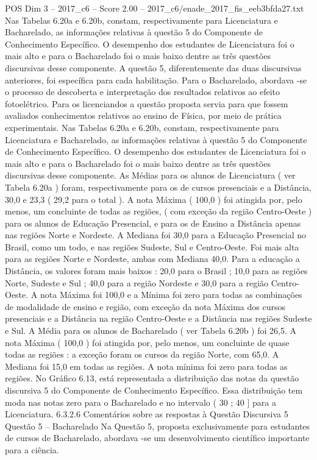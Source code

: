 \begin{textsample}{POS Dim 3 – 2017\_c6 – Score 2.00 – 2017\_c6/enade\_2017\_fis\_eeb3bfda27.txt}
Nas Tabelas 6.20a e 6.20b, constam, respectivamente para Licenciatura e Bacharelado, as informações relativas à questão 5 do Componente de Conhecimento Específico.
O desempenho dos estudantes de Licenciatura foi o mais alto e para o Bacharelado foi o mais baixo dentre as três questões discursivas desse componente.
A questão 5, diferentemente das duas discursivas anteriores, foi específica para cada habilitação.
Para o Bacharelado, abordava -se o processo de descoberta e interpretação dos resultados relativos ao efeito fotoelétrico.
Para os licenciandos a questão proposta servia para que fossem avaliados conhecimentos relativos ao ensino de Física, por meio de prática experimentais.
Nas Tabelas 6.20a e 6.20b, constam, respectivamente para Licenciatura e Bacharelado, as informações relativas à questão 5 do Componente de Conhecimento Específico.
O desempenho dos estudantes de Licenciatura foi o mais alto e para o Bacharelado foi o mais baixo dentre as três questões discursivas desse componente.
As Médias para os alunos de Licenciatura ( ver Tabela 6.20a ) foram, respectivamente para os de cursos presenciais e a Distância, 30,0 e 23,3 ( 29,2 para o total ).
A nota Máxima ( 100,0 ) foi atingida por, pelo menos, um concluinte de todas as regiões, ( com exceção da região Centro-Oeste ) para os alunos de Educação Presencial, e para os de Ensino a Distância apenas nas regiões Norte e Nordeste.
A Mediana foi 30,0 para a Educação Presencial no Brasil, como um todo, e nas regiões Sudeste, Sul e Centro-Oeste.
Foi mais alta para as regiões Norte e Nordeste, ambas com Mediana 40,0.
Para a educação a Distância, os valores foram mais baixos : 20,0 para o Brasil ; 10,0 para as regiões Norte, Sudeste e Sul ; 40,0 para a região Nordeste e 30,0 para a região Centro-Oeste.
A nota Máxima foi 100,0 e a Mínima foi zero para todas as combinações de modalidade de ensino e região, com exceção da nota Máxima dos cursos presenciais e a Distância na região Centro-Oeste e a Distância nas regiões Sudeste e Sul.
A Média para os alunos de Bacharelado ( ver Tabela 6.20b ) foi 26,5.
A nota Máxima ( 100,0 ) foi atingida por, pelo menos, um concluinte de quase todas as regiões : a exceção foram os cursos da região Norte, com 65,0.
A Mediana foi 15,0 em todas as regiões.
A nota mínima foi zero para todas as regiões.
No Gráfico 6.13, está representada a distribuição das notas da questão discursiva 5 do Componente de Conhecimento Específico.
Essa distribuição tem moda nas notas zero para o Bacharelado e no intervalo ( 30 ; 40 ] para a Licenciatura. 6.3.2.6 Comentários sobre as respostas à Questão Discursiva 5 Questão 5 – Bacharelado Na Questão 5, proposta exclusivamente para estudantes de cursos de Bacharelado, abordava -se um desenvolvimento científico importante para a ciência.

\end{textsample}
